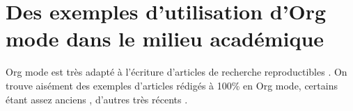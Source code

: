 \documentclass[11pt]{article}
\begin{document}
\section{Des exemples d'utilisation d'Org mode dans le milieu académique}
\label{sec:orgfb5c6ac}
Org mode est très adapté à l'écriture d'articles de recherche reproductibles \citep{schulte2012_MultiLanguageComputingEnvironment}. On trouve aisément des exemples d'articles rédigés à 100\% en Org mode, certains étant assez anciens \citep[e.g.,][]{dye2011_ModelbasedAgeEstimate}, d'autres très récents \citep{santos2020_ModernMethodsOld,fraga2021_MultipleSimultaneousSolution}.



\end{document}
